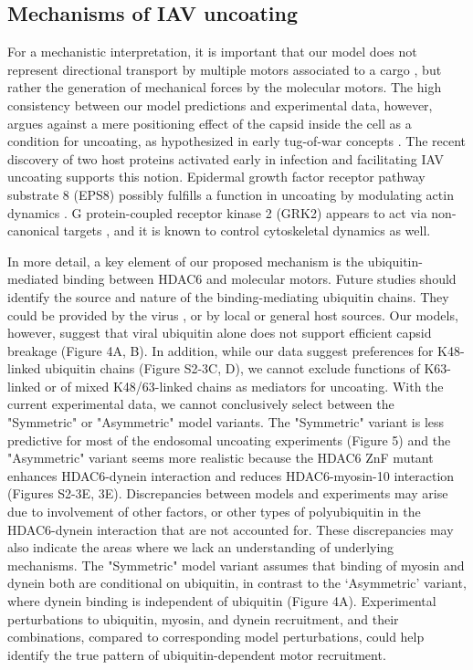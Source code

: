 \subsection{Mechanisms of IAV uncoating}

For a mechanistic interpretation, it is important that our model does not represent directional transport by multiple motors associated to a cargo \cite{hancock2014bidirectional}, but rather the generation of mechanical forces by the molecular motors. The high consistency between our model predictions and experimental data, however, argues against a mere positioning effect of the capsid inside the cell as a condition for uncoating, as hypothesized in early tug-of-war concepts \cite{lukic2014hiv, radtke2010plus}. The recent discovery of two host proteins activated early in infection and facilitating IAV uncoating supports this notion. Epidermal growth factor receptor pathway substrate 8 (EPS8) possibly fulfills a function in uncoating by modulating actin dynamics \cite{larson2019eps8}. G protein-coupled receptor kinase 2 (GRK2) appears to act via non-canonical targets \cite{yanguez2018phosphoproteomic}, and it is known to control cytoskeletal dynamics as well.

In more detail, a key element of our proposed mechanism is the ubiquitin-mediated binding between HDAC6 and molecular motors. Future studies should identify the source and nature of the binding-mediating ubiquitin chains. They could be provided by the virus \cite{banerjee2014influenza}, or by local or general host sources. Our models, however, suggest that viral ubiquitin alone does not support efficient capsid breakage (Figure 4A, B). In addition, while our data suggest preferences for K48-linked ubiquitin chains (Figure S2-3C, D), we cannot exclude functions of K63-linked or of mixed K48/63-linked chains as mediators for uncoating. With the current experimental data, we cannot conclusively select between the "Symmetric" or "Asymmetric" model variants. The "Symmetric" variant is less predictive for most of the endosomal uncoating experiments (Figure 5) and the "Asymmetric" variant seems more realistic because the HDAC6 ZnF mutant enhances HDAC6-dynein interaction and reduces HDAC6-myosin-10 interaction (Figures S2-3E, 3E). Discrepancies between models and experiments may arise due to involvement of other factors, or other types of polyubiquitin in the HDAC6-dynein interaction that are not accounted for. These discrepancies may also indicate the areas where we lack an understanding of underlying mechanisms. The "Symmetric" model variant assumes that binding of myosin and dynein both are conditional on ubiquitin, in contrast to the ‘Asymmetric’ variant, where dynein binding is independent of ubiquitin (Figure 4A). Experimental perturbations to ubiquitin, myosin, and dynein recruitment, and their combinations, compared to corresponding model perturbations, could help identify the true pattern of ubiquitin-dependent motor recruitment.

